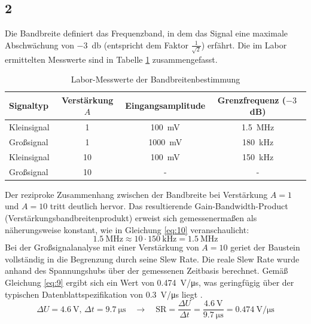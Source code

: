 \subsection*{2}
Die Bandbreite definiert das Frequenzband, in dem das Signal eine maximale Abschwächung von \qty{-3}{\decibel} (entspricht dem Faktor $\frac{1}{\sqrt{2}}$) erfährt. Die im Labor ermittelten Messwerte sind in Tabelle \ref{tab:1} zusammengefasst.
\begin{table}[H]
        \centering
        \begin{tabular}{l|c|c|c}
                Signaltyp       & Verstärkung $A$ &  Eingangsamplitude & Grenzfrequenz ($-3$\,dB) \\
                \hline
                Kleinsignal     & 1               & \qty{100}{\milli\volt}  & \qty{1,5}{\mega\hertz}\\
                \hline
                Großsignal      & 1               & \qty{1000}{\milli\volt} & \qty{180}{\kilo\hertz}\\
                \hline
                Kleinsignal     & 10              & \qty{100}{\milli\volt}  & \qty{150}{\kilo\hertz}\\
                \hline
                Großsignal      & 10              & -                       & -                       \\
        \end{tabular}
        \caption{Labor-Messwerte der Bandbreitenbestimmung}
        \label{tab:1}
\end{table}
Der reziproke Zusammenhang zwischen der Bandbreite bei Verstärkung $A=1$ und $A=10$ tritt deutlich hervor. Das resultierende Gain-Bandwidth-Product (Verstärkungsbandbreitenprodukt) erweist sich gemessenermaßen als näherungsweise konstant, wie in Gleichung \ref{eq:10} veranschaulicht:
\begin{equation}
        \qty{1,5}{\mega\hertz} \approx 10 \cdot \qty{150}{\kilo\hertz} = \qty{1,5}{\mega\hertz}
        \label{eq:10}
\end{equation} 
Bei der Großsignalanalyse mit einer Verstärkung von $A = 10$ geriet der Baustein vollständig in die Begrenzung durch seine Slew Rate. Die reale Slew Rate wurde anhand des Spannungshubs über der gemessenen Zeitbasis berechnet. Gemäß Gleichung \ref{eq:9} ergibt sich ein Wert von \qty{0,474}{\volt/\micro\second}, was geringfügig über der typischen Datenblattspezifikation von \qty{0,3}{\volt/\micro\second} liegt \cite{datasheet}.
\begin{equation}
        \Delta U = \qty{4,6}{\volt}, \, \Delta t = \qty{9,7}{\micro\second}  \quad \rightarrow \quad \text{SR} = \frac{\Delta U}{\Delta t} = \frac{\qty{4,6}{\volt}}{\qty{9,7}{\micro\second}} = \qty{0,474}{\volt/\micro\second}
        \label{eq:9}
\end{equation}

